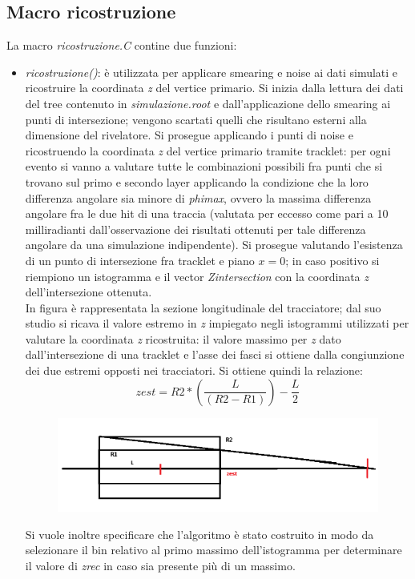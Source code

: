\documentclass{article}
\begin{document}
\subsection{Macro ricostruzione}
La macro \textit{ricostruzione.C} contine due funzioni: 
\begin{itemize}
	\item \textit{ricostruzione()}: è utilizzata per applicare smearing e noise ai dati simulati e ricostruire la coordinata \textit{z} del vertice primario. Si inizia dalla lettura dei dati del tree contenuto in \textit{simulazione.root} e dall'applicazione dello smearing ai punti di intersezione; vengono scartati quelli che risultano esterni alla dimensione del rivelatore. Si prosegue applicando i punti di noise e ricostruendo la coordinata \textit{z} del vertice primario tramite tracklet: per ogni evento si vanno a valutare tutte le combinazioni possibili fra punti che si trovano sul primo e secondo layer applicando la condizione che la loro differenza angolare sia minore di \textit{phimax}, ovvero la massima differenza angolare fra le due hit di una traccia (valutata per eccesso come pari a 10 milliradianti dall'osservazione dei risultati ottenuti per tale differenza angolare da una simulazione indipendente). Si prosegue valutando l'esistenza di un punto di intersezione fra tracklet e piano $x=0$; in caso positivo si riempiono un istogramma e il vector \textit{Zintersection} con la coordinata \textit{z} dell'intersezione ottenuta.
	\\
	In figura è rappresentata la sezione longitudinale del tracciatore; dal suo studio si ricava il valore estremo in \textit{z} impiegato negli istogrammi utilizzati per valutare la coordinata \textit{z} ricostruita: il valore massimo per \textit{z} dato dall'intersezione di una tracklet e l'asse dei fasci si ottiene dalla congiunzione dei due estremi opposti nei tracciatori. Si ottiene quindi la relazione:
	$$zest=R2*\left(\frac{L}{(R2-R1)}\right)-\frac{L}{2}$$

	\begin{figure}[H]
		\centering
		\includegraphics[scale=0.4]{vertice}
	\end{figure}
	\noindent
	Si vuole inoltre specificare che l'algoritmo è stato costruito in modo da selezionare il bin relativo al primo massimo dell'istogramma per determinare il valore di \textit{zrec} in caso sia presente più di un massimo. 
	

\end{itemize}
\end{document}

